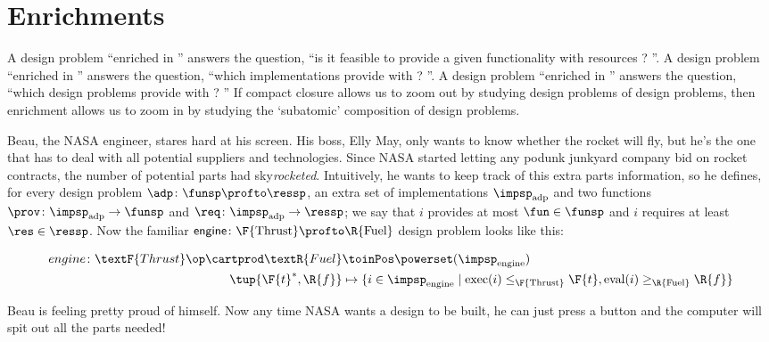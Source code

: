 
\section{Enrichments}
\label{sec:enriched}


A design problem ``enriched in \Bool'' answers the question, ``is it feasible to provide a given functionality \fun with resources \res?
''.
A design problem ``enriched in \Set'' answers the question, ``which implementations provide \fun with \res?
''.
A design problem ``enriched in \DP'' answers the question, ``which design problems provide \fun with \res?
'' If compact closure allows us to zoom out by studying design problems of design problems, then enrichment allows us to zoom in by studying the `subatomic' composition of design problems.

\begin{example}
	\label{ex:dpi_example}
	Beau, the NASA engineer, stares hard at his screen.
	His boss, Elly May, only wants to know whether the rocket will fly, but he's the one that has to deal with all potential suppliers and technologies.
	Since NASA started letting any podunk junkyard company bid on rocket contracts, the number of potential parts had sky\emph{rocketed}.
	Intuitively, he wants to keep track of this extra parts information, so he defines, for every design problem $\adp \colon \funsp \profto \ressp$, an extra set of implementations $\impsp_\text{adp}$ and two functions $\prov\colon \impsp_\text{adp} \to \funsp$ and  $\req\colon \impsp_\text{adp} \to \ressp$; we say that $i$ provides at most $\fun \in \funsp$ and $i$ requires at least $\res \in \ressp$.
	Now the familiar $\mathsf{engine} \colon \F{\text{Thrust}} \profto \R{\text{Fuel}}$ design problem looks like this:
	\begin{widepar}
		\begin{equation*}
			\begin{aligned}
				engine \colon \textF{Thrust}\op \cartprod \textR{Fuel} & \toinPos \powerset(\impsp_\text{engine})                                                                                             \\
				\tup{\F{t}^*,\R{f}}                                    & \mapsto \{ i \in \impsp_\text{engine} \mid \text{exec}(i) \leq_\F{\text{Thrust}} \F{t}, \text{eval}(i) \geq_\R{\text{Fuel}} \R{f} \}
			\end{aligned}
		\end{equation*}
	\end{widepar}
	Beau is feeling pretty proud of himself.
	Now any time NASA wants a design to be built, he can just press a button and the computer will spit out all the parts needed!
\end{example}

